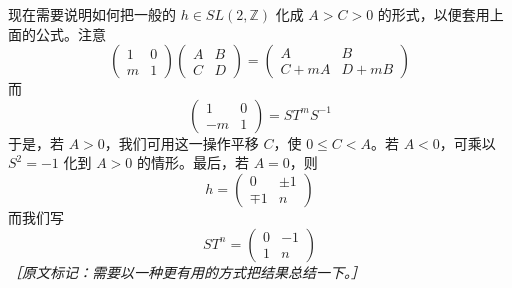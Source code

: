 现在需要说明如何把一般的 $h\in SL(2,\mathbb{Z})$ 化成 $A>C>0$ 的形式，以便套用上面的公式。注意
\begin{equation}
  \begin{pmatrix}
    1 & 0\\
    m & 1
  \end{pmatrix}\begin{pmatrix}
    A & B\\
    C & D
  \end{pmatrix}=\begin{pmatrix}
    A & B\\
    C+mA & D+mB
  \end{pmatrix}
  \tag{C.28}
  \label{eq:C.28}
\end{equation}
而
\begin{equation}
  \begin{pmatrix}
    1 & 0\\
    -m & 1
  \end{pmatrix}=ST^mS^{-1}
  \tag{C.29}
  \label{eq:C.29}
\end{equation}
于是，若 $A>0$，我们可用这一操作平移 $C$，使 $0\le C<A$。若 $A<0$，可乘以 $S^2=-1$ 化到 $A>0$ 的情形。最后，若 $A=0$，则
\begin{equation}
  h=\begin{pmatrix}
    0 & \pm1\\
    \mp1 & n
  \end{pmatrix}
  \tag{C.30}
  \label{eq:C.30}
\end{equation}
而我们写
\begin{equation}
  ST^n=\begin{pmatrix}
    0 & -1\\
    1 & n
  \end{pmatrix}
  \tag{C.31}
  \label{eq:C.31}
\end{equation}
{\small\itshape ［原文标记：需要以一种更有用的方式把结果总结一下。］}
